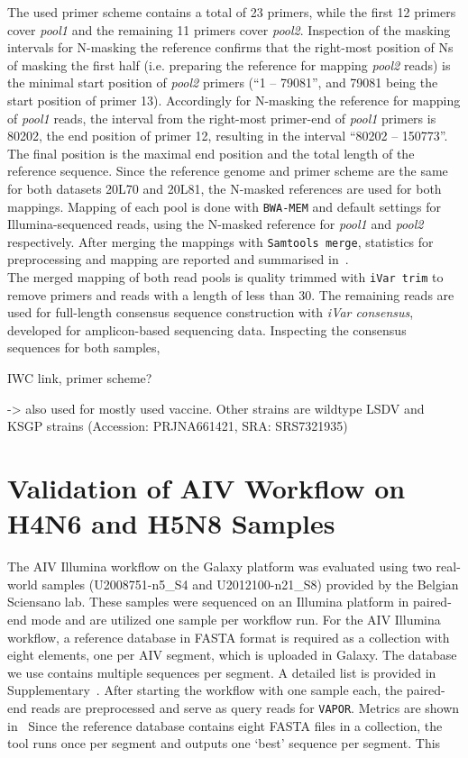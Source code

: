 The used primer scheme contains a total of 23 primers, while the first 12 primers cover \textit{pool1} and the remaining 11 primers cover \textit{pool2}. Inspection of the masking intervals for N-masking the reference confirms that the right-most position of Ns of masking the first half (i.e. preparing the reference for mapping \textit{pool2} reads) is the minimal start position of \textit{pool2} primers (``1 -- 79081'', and 79081 being the start position of primer 13). Accordingly for N-masking the reference for mapping of \textit{pool1} reads, the interval from the right-most primer-end of \textit{pool1} primers is 80202, the end position of primer 12, resulting in the interval ``80202 -- 150773''. The final position is the maximal end position and the total length of the reference sequence. Since the reference genome and primer scheme are the same for both datasets 20L70 and 20L81, the N-masked references are used for both mappings. Mapping of each pool is done with \texttt{BWA-MEM} and default settings for Illumina-sequenced reads, using the N-masked reference for \textit{pool1} and \textit{pool2} respectively. After merging the mappings with \texttt{Samtools merge}, statistics for preprocessing and mapping are reported and summarised in~. \\
The merged mapping of both read pools is quality trimmed with \texttt{iVar trim} to remove primers and reads with a length of less than 30. The remaining reads are used for full-length consensus sequence construction with \textit{iVar consensus}, developed for amplicon-based sequencing data. Inspecting the consensus sequences for both samples, %

\todoit
\ac{IWC} link, primer scheme?

-> also used for mostly used vaccine. Other strains are wildtype LSDV and KSGP strains (Accession: PRJNA661421, SRA: SRS7321935)


\section{Validation of AIV Workflow on H4N6 and H5N8 Samples}\label{sec:4-aiv}
The AIV Illumina workflow on the Galaxy platform was evaluated using two real-world samples (U2008751-n5\_S4 and U2012100-n21\_S8) provided by the Belgian Sciensano lab. These samples were sequenced on an Illumina platform in paired-end mode and are utilized one sample per workflow run.  For the AIV Illumina workflow, a reference database in FASTA format is required as a collection with eight elements, one per AIV segment, which is uploaded in Galaxy. The database we use contains multiple sequences per segment. A detailed list is provided in Supplementary~.
After starting the workflow with one sample each, the paired-end reads are preprocessed and serve as query reads for \texttt{VAPOR}. Metrics are shown in~ Since the reference database contains eight FASTA files in a collection, the tool runs once per segment and outputs one `best' sequence per segment. This

